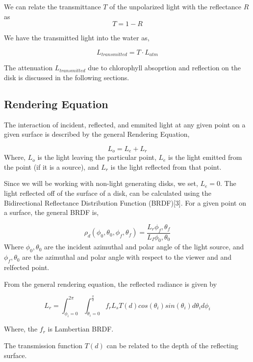 \documentclass{article}
\begin{document}
We can relate the transmittance $ T$ of the unpolarized light with
the reflectance $ R$ as
$$ T = 1 - R$$

We have the transmitted light into the water as,

$$ L_{transmitted} = T \cdot L_{atm} $$

The attenuation $ L_{transmitted}$ due to chlorophyll absoprtion and reflection
on the disk is discussed in the following sections.



\subsection{Rendering Equation}

The interaction of incident, reflected, and emmited light at any given point on a
given surface is
described by the general Rendering Equation,

\begin{equation}
  L_o = L_e + L_r
\end{equation}
Where, $L_o$ is the light leaving the particular point, $ L_e$ is the light emitted
from the point (if it is a source), and $L_r $ is the light reflected from that point.

Since we will be working with non-light generating disks, we set,
$ L_e = 0$.
The light reflected off of the surface of a disk, can be calculated using the
Bidirectional Reflectance Distribution Function (BRDF)[3].
For a given point on a surface, the general BRDF is,

\begin{equation}
\rho_d(\phi_0, \theta_0,\phi_f, \theta_f)=\frac{L_r{\phi_f, \theta_f}}{L_I{\phi_0, \theta_0}}
\end{equation}
Where $\phi_0, \theta_0$ are the incident azimuthal and polar angle of the light source,
and $\phi_f, \theta_0$ are the azimuthal and polar angle with respect to the viewer and
and relfected point.

From the general rendering equation, the reflected radiance is given by

\begin{equation}
  L_r = \int^{2\pi}_{\phi_i = 0}\int^{\frac{\pi}{2}}_{\theta_i = 0}
  f_r L_s T(d)cos(\theta_i)sin(\theta_i)d\theta_i d\phi_i
\end{equation}

Where, the $ f_r$ is Lambertian BRDF.

The transmission function $T(d)$ can be related to the depth of the reflecting
surface.
\end{document}
